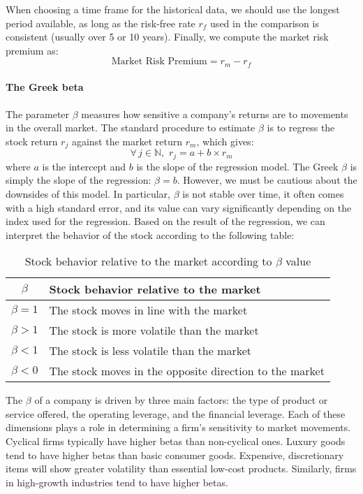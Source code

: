 When choosing a time frame for the historical data, we should use the longest period available, as long as the risk-free rate $r_f$ used in the comparison is consistent (usually over 5 or 10 years). Finally, we compute the market risk premium as:
$$
\text{Market Risk Premium} = r_m - r_f
$$
\paragraph{The Greek beta}

The parameter $\beta$ measures how sensitive a company’s returns are to movements in the overall market. The standard procedure to estimate $\beta$ is to regress the stock return $r_j$ against the market return $r_m$, which gives: 
\begin{equation}
    \forall\,j\in \mathbb{N},\,\, r_j = a + b \times r_m
\end{equation}
where $a$ is the intercept and $b$ is the slope of the regression model. The Greek $\beta$ is simply the slope of the regression: $\beta = b$. However, we must be cautious about the downsides of this model. In particular, $\beta$ is not stable over time, it often comes with a high standard error, and its value can vary significantly depending on the index used for the regression. Based on the result of the regression, we can interpret the behavior of the stock according to the following table:

\begin{table}[H]
    \centering
    \begin{tabularx}{\textwidth}{cX}
        \toprule
        $\beta$ & \textbf{Stock behavior relative to the market} \\
        \midrule
        $\beta = 1$ & The stock moves in line with the market \\ 
        $\beta > 1$ & The stock is more volatile than the market \\
        $\beta < 1$ & The stock is less volatile than the market \\
        $\beta < 0$ & The stock moves in the opposite direction to the market \\
        \bottomrule
    \end{tabularx}
    \caption{Stock behavior relative to the market according to $\beta$ value}
    \label{tab:my_label}
\end{table}

The $\beta$ of a company is driven by three main factors: the type of product or service offered, the operating leverage, and the financial leverage. Each of these dimensions plays a role in determining a firm's sensitivity to market movements. Cyclical firms typically have higher betas than non-cyclical ones. Luxury goods tend to have higher betas than basic consumer goods. Expensive, discretionary items will show greater volatility than essential low-cost products. Similarly, firms in high-growth industries tend to have higher betas.

